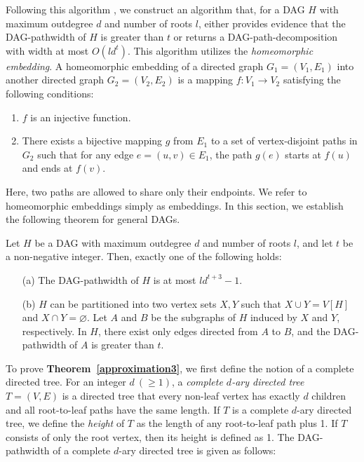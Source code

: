 \documentclass[runningheads]{llncs}
\theoremstyle{plain}
\theoremstyle{definition}
\begin{document}
Following this algorithm \cite{art8}, we construct an algorithm that, for a DAG $H$ with maximum outdegree $d$ and number of roots $l$, either provides evidence that the DAG-pathwidth of $H$ is greater than $t$ or returns a DAG-path-decomposition with width at most $O(ld^t)$. This algorithm utilizes the \emph{homeomorphic embedding}. A homeomorphic embedding of a directed graph $G_1 = (V_1, E_1)$ into another directed graph $G_2 = (V_2, E_2)$ is a mapping $f: V_1 \rightarrow V_2$ satisfying the following conditions:
\begin{enumerate}
    \item $f$ is an injective function.
    \item There exists a bijective mapping $g$ from $E_1$ to a set of vertex-disjoint paths in $G_2$ such that for any edge $e = (u, v) \in E_1$, the path $g(e)$ starts at $f(u)$ and ends at $f(v)$.
\end{enumerate}
Here, two paths are allowed to share only their endpoints. We refer to homeomorphic embeddings simply as embeddings. In this section, we establish the following theorem for general DAGs.

\begin{theorem}\label{approximation3}
    Let $H$ be a DAG with maximum outdegree $d$ and number of roots $l$, and let $t$ be a non-negative integer. Then, exactly one of the following holds:
    \begin{enumerate}
        \item[(a)] The DAG-pathwidth of $H$ is at most $ld^{t+3}-1$.
        \item[(b)] $H$ can be partitioned into two vertex sets $X, Y$ such that $X \cup Y = V[H]$ and $X \cap Y = \varnothing$. Let $A$ and $B$ be the subgraphs of $H$ induced by $X$ and $Y$, respectively. In $H$, there exist only edges directed from $A$ to $B$, and the DAG-pathwidth of $A$ is greater than $t$.
    
    \end{enumerate}
\end{theorem}

To prove \textbf{Theorem~\ref{approximation3}}, we first define the notion of a complete directed tree. For an integer $d~(\geq 1)$, a \emph{complete $d$-ary directed tree} $T=(V, E)$ is a directed tree that every non-leaf vertex has exactly $d$ children and all root-to-leaf paths have the same length. If $T$ is a complete $d$-ary directed tree, we define the \emph{height} of $T$ as the length of any root-to-leaf path plus 1. If $T$ consists of only the root vertex, then its height is defined as 1. The DAG-pathwidth of a complete $d$-ary directed tree is given as follows: 
\end{document}
